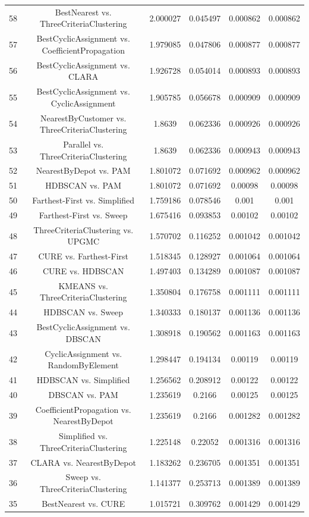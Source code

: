 \documentclass[a4paper,10pt]{article}
\begin{document}
\begin{landscape}
\begin{table}[!htp]
\begin{tabular}{cccccc}
58&BestNearest vs. ThreeCriteriaClustering&2.000027&0.045497&0.000862&0.000862\\
57&BestCyclicAssignment vs. CoefficientPropagation&1.979085&0.047806&0.000877&0.000877\\
56&BestCyclicAssignment vs. CLARA&1.926728&0.054014&0.000893&0.000893\\
55&BestCyclicAssignment vs. CyclicAssignment&1.905785&0.056678&0.000909&0.000909\\
54&NearestByCustomer vs. ThreeCriteriaClustering&1.8639&0.062336&0.000926&0.000926\\
53&Parallel vs. ThreeCriteriaClustering&1.8639&0.062336&0.000943&0.000943\\
52&NearestByDepot vs. PAM&1.801072&0.071692&0.000962&0.000962\\
51&HDBSCAN vs. PAM&1.801072&0.071692&0.00098&0.00098\\
50&Farthest-First vs. Simplified&1.759186&0.078546&0.001&0.001\\
49&Farthest-First vs. Sweep&1.675416&0.093853&0.00102&0.00102\\
48&ThreeCriteriaClustering vs. UPGMC&1.570702&0.116252&0.001042&0.001042\\
47&CURE vs. Farthest-First&1.518345&0.128927&0.001064&0.001064\\
46&CURE vs. HDBSCAN&1.497403&0.134289&0.001087&0.001087\\
45&KMEANS vs. ThreeCriteriaClustering&1.350804&0.176758&0.001111&0.001111\\
44&HDBSCAN vs. Sweep&1.340333&0.180137&0.001136&0.001136\\
43&BestCyclicAssignment vs. DBSCAN&1.308918&0.190562&0.001163&0.001163\\
42&CyclicAssignment vs. RandomByElement&1.298447&0.194134&0.00119&0.00119\\
41&HDBSCAN vs. Simplified&1.256562&0.208912&0.00122&0.00122\\
40&DBSCAN vs. PAM&1.235619&0.2166&0.00125&0.00125\\
39&CoefficientPropagation vs. NearestByDepot&1.235619&0.2166&0.001282&0.001282\\
38&Simplified vs. ThreeCriteriaClustering&1.225148&0.22052&0.001316&0.001316\\
37&CLARA vs. NearestByDepot&1.183262&0.236705&0.001351&0.001351\\
36&Sweep vs. ThreeCriteriaClustering&1.141377&0.253713&0.001389&0.001389\\
35&BestNearest vs. CURE&1.015721&0.309762&0.001429&0.001429\\

\end{tabular}
\end{table}
\end{landscape}
\end{document}
